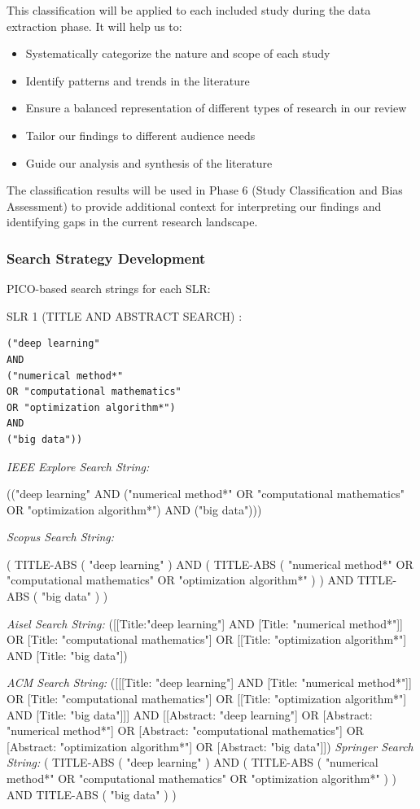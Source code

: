 \documentclass[a4paper,12pt]{article}
\begin{document}
This classification will be applied to each included study during the data extraction phase. It will help us to:

\begin{itemize}
    \item Systematically categorize the nature and scope of each study
    \item Identify patterns and trends in the literature
    \item Ensure a balanced representation of different types of research in our review
    \item Tailor our findings to different audience needs
    \item Guide our analysis and synthesis of the literature
\end{itemize}

The classification results will be used in Phase 6 (Study Classification and Bias Assessment) to provide additional context for interpreting our findings and identifying gaps in the current research landscape.

\subsubsection{Search Strategy Development}
PICO-based search strings for each SLR:

SLR 1 (TITLE AND ABSTRACT SEARCH) :
\begin{verbatim}
("deep learning"
AND 
("numerical method*" 
OR "computational mathematics" 
OR "optimization algorithm*")
AND 
("big data"))
\end{verbatim}


\emph{IEEE Explore Search String:}

(("deep learning" AND ("numerical method*" OR "computational mathematics" OR "optimization algorithm*") AND ("big data")))

\emph{Scopus Search String:}

( TITLE-ABS ( "deep learning" ) AND ( TITLE-ABS ( "numerical method*" OR "computational mathematics" OR "optimization algorithm*" ) ) AND TITLE-ABS ( "big data" ) )

\emph{Aisel Search String:}
([[Title:"deep learning"] AND [Title: "numerical method*"]] OR [Title: "computational mathematics"] OR [[Title: "optimization algorithm*"] AND [Title: "big data"])

\emph{ACM Search String:}
([[[Title: "deep learning"] AND [Title: "numerical method*"]] OR [Title: "computational mathematics"] OR [[Title: "optimization algorithm*"] AND [Title: "big data"]]] AND [[Abstract: "deep learning"] OR [Abstract: "numerical method*"] OR [Abstract: "computational mathematics"] OR [Abstract: "optimization algorithm*"] OR [Abstract: "big data"]])
\emph{Springer Search String:}
( TITLE-ABS ( "deep learning" ) AND ( TITLE-ABS ( "numerical method*" OR "computational mathematics" OR "optimization algorithm*" ) ) AND TITLE-ABS ( "big data" ) )
\end{document}
